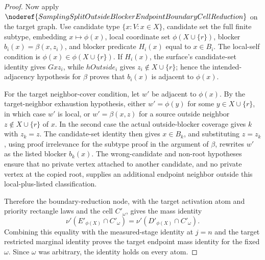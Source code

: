\begin{proof}
Now apply
\(\noderef{SamplingSplitOutsideBlockerEndpointBoundaryCellReduction}\) on the
target graph.  Use candidate type \(\{x:V:x\in X\}\), candidate set the full
finite subtype, embedding \(x\mapsto\phi(x)\), local coordinate set
\(\phi(X\cup\{r\})\), blocker \(b_i(x)=\beta(x,z_i)\), and blocker predicate
\(H_i(x)\) equal to \(x\in B_i\).  The local-self condition is
\(\phi(x)\in\phi(X\cup\{r\})\).  If \(H_i(x)\), the surface's
candidate-set identity gives \(Gxz_i\), while \(hOutside_i\) gives
\(z_i\notin X\cup\{r\}\); hence the intended-adjacency hypothesis for
\(\beta\) proves that \(b_i(x)\) is adjacent to \(\phi(x)\).

For the target neighbor-cover condition, let \(w'\) be adjacent to
\(\phi(x)\).  By the target-neighbor exhaustion hypothesis, either
\(w'=\phi(y)\) for some \(y\in X\cup\{r\}\), in which case \(w'\) is local,
or \(w'=\beta(x,z)\) for a source outside neighbor
\(z\notin X\cup\{r\}\) of \(x\).  In the second case the actual
outside-blocker coverage gives \(k\) with \(z_k=z\).  The candidate-set
identity then gives \(x\in B_k\), and substituting \(z=z_k\), using proof
irrelevance for the subtype proof in the argument of \(\beta\), rewrites
\(w'\) as the listed blocker \(b_k(x)\).  The wrong-candidate and non-root
hypotheses ensure that no private vertex attached to another candidate, and
no private vertex at the copied root, supplies an additional endpoint
neighbor outside this local-plus-listed classification.

Therefore the boundary-reduction node, with the target activation atom and
priority rectangle laws and the cell \(C'_\omega\), gives the mass identity
\[
  \nu'(E'_{\phi(X)}\cap C'_\omega)
  =
  \nu'(D'_{\phi(X)}\cap C'_\omega).
\]
Combining this equality with the measured-stage identity at \(j=n\) and the
target restricted marginal identity proves the target endpoint mass identity
for the fixed \(\omega\).  Since \(\omega\) was arbitrary, the identity holds
on every atom.
\end{proof}
